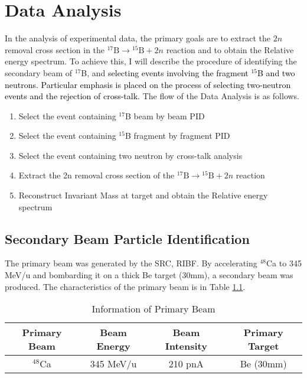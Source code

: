 \chapter{Data Analysis}
In the analysis of experimental data, the primary goals are to extract the $2n$ removal cross section in the ${}^{17}\text{B} \to {}^{15}\text{B} + 2n$ reaction and to obtain the Relative energy spectrum. To achieve this, I will describe the procedure of identifying the secondary beam of ${}^{17}$B, and \textcolor{black}{selecting events involving the fragment ${}^{15}$B and two neutrons. Particular emphasis is placed on the process of selecting two-neutron events and the rejection of cross-talk.} The flow of the Data Analysis is as follows.

\begin{center}
    \begin{enumerate}[noitemsep]
        \item Select the event containing ${}^{17}$B beam by beam PID
        \item Select the event containing ${}^{15}$B fragment by fragment PID
        \item Select the event containing two neutron by cross-talk analysis
        \item Extract the 2n removal cross section of the ${}^{17}\text{B} \to {}^{15}\text{B} + 2n$ reaction
        \item Reconstruct Invariant Mass at target and obtain the Relative energy spectrum 
    \end{enumerate}
\end{center}

\section{Secondary Beam Particle Identification}
The primary beam was generated by the SRC, RIBF. By accelerating ${}^{48}$Ca to 345 MeV/u and bombarding it on a thick Be target (30mm), a secondary beam was produced. The characteristics of the primary beam is in Table \ref{tab:Primary_Beam}.

    \begin{table}[h]
        \centering 
            \begin{tabular}[]{c|c|c|c}
                \hline
                Primary Beam & Beam Energy & Beam Intensity & Primary Target  \\
                \hline 
                ${}^{48}$Ca & 345 MeV/u & 210 pnA & Be (30mm)\\
                \hline    
            \end{tabular}
        \caption{Information of Primary Beam}
        \label{tab:Primary_Beam}
    \end{table}

